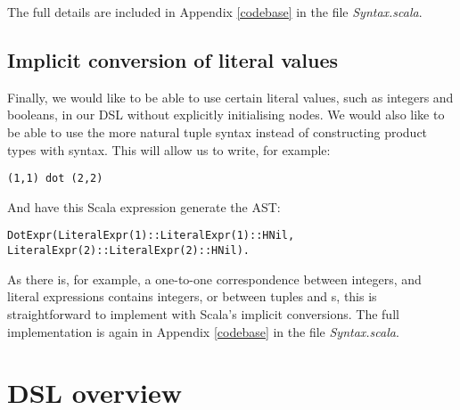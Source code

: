 The full details are included in Appendix \ref{codebase} in the file \textit{Syntax.scala}.

\subsection{Implicit conversion of literal values}

Finally, we would like to be able to use certain literal values, such as integers and booleans, in our DSL without explicitly initialising  nodes. We would also like to be able to use the more natural tuple syntax instead of constructing product types with  syntax. This will allow us to write, for example:
\vs\begin{lstlisting}
(1,1) dot (2,2)
\end{lstlisting}\vs
And have this Scala expression generate the AST:
\vs\begin{lstlisting}
DotExpr(LiteralExpr(1)::LiteralExpr(1)::HNil, LiteralExpr(2)::LiteralExpr(2)::HNil).
\end{lstlisting}\vs
As there is, for example, a one-to-one correspondence between integers, and literal expressions contains integers, or between tuples and s, this is straightforward to implement with Scala's implicit conversions. The full implementation is again in Appendix \ref{codebase} in the file \textit{Syntax.scala}.
\section{DSL overview}

